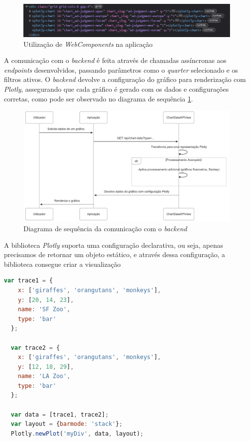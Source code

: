 \begin{figure}[H]
    \centering
    \includegraphics[max width=\textwidth]{./img/webc}
 \caption{Utilização de \textit{WebComponents} na aplicação}
 \end{figure}

A comunicação com o \textit{backend} é feita através de chamadas assíncronas aos \textit{endpoints} desenvolvidos, passando parâmetros como o \textit{quarter} selecionado e os filtros ativos. O \textit{backend} devolve a configuração do gráfico para renderização com \textit{Plotly}, assegurando que cada gráfico é gerado com os dados e configurações corretas, como pode ser observado no diagrama de sequência \ref{fig:sequence}.

\begin{figure}[H]
    \centering
    \includegraphics[max width=\textwidth]{./img/sequence}
 \caption{Diagrama de sequência da comunicação com o \textit{backend}}
 \label{fig:sequence}
\end{figure}

A biblioteca \textit{Plotly} suporta uma configuração declarativa, ou seja, apenas precisamos de retornar um objeto estático, e através dessa configuração, a biblioteca consegue criar a visualização

\begin{lstlisting}[language=Javascript, caption={Excerto de uma configuração para um gráfico com a utilização da biblioteca \textit{Plotly}}]
  var trace1 = {
    x: ['giraffes', 'orangutans', 'monkeys'],
    y: [20, 14, 23],
    name: 'SF Zoo',
    type: 'bar'
  };
  
  var trace2 = {
    x: ['giraffes', 'orangutans', 'monkeys'],
    y: [12, 18, 29],
    name: 'LA Zoo',  
    type: 'bar'
  };
  
  var data = [trace1, trace2];
  var layout = {barmode: 'stack'};
  Plotly.newPlot('myDiv', data, layout);
\end{lstlisting}

